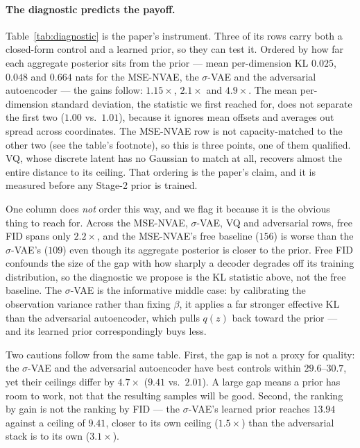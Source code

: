 \documentclass[sigconf,nonacm]{acmart}
\begin{document}
\paragraph{The diagnostic predicts the payoff.}
Table~\ref{tab:diagnostic} is the paper's instrument. Three of its rows
carry both a closed-form control and a learned prior, so they can test it.
Ordered by how far each aggregate posterior sits from the prior --- mean
per-dimension KL $0.025$, $0.048$ and $0.664$ nats for the MSE-NVAE, the
$\sigma$-VAE and the adversarial autoencoder --- the gains follow: $1.15\times$,
$2.1\times$ and $4.9\times$. The mean per-dimension standard deviation, the
statistic we first reached for, does not separate the first two ($1.00$ vs.\
$1.01$), because it ignores mean offsets and averages out spread across
coordinates. The MSE-NVAE row is not capacity-matched to the other two (see the
table's footnote), so this is three points, one of them qualified.
VQ, whose discrete latent has no Gaussian to match at all, recovers almost the
entire distance to its ceiling. That ordering is the paper's claim, and it is
measured before any Stage-2 prior is trained.

One column does \emph{not} order this way, and we flag it because it is the
obvious thing to reach for. Across the MSE-NVAE, $\sigma$-VAE, VQ and adversarial rows,
free FID spans only $2.2\times$, and the MSE-NVAE's free baseline ($156$) is worse than the $\sigma$-VAE's ($109$) even though its aggregate
posterior is closer to the prior. Free FID confounds the size of the gap with
how sharply a decoder degrades off its training distribution, so the diagnostic
we propose is the KL statistic above, not the free baseline. The $\sigma$-VAE is the informative middle case: by
calibrating the observation variance rather than fixing $\beta$, it applies a
far stronger effective KL than the adversarial autoencoder, which pulls $q(z)$
back toward the prior --- and its learned prior correspondingly buys less.

Two cautions follow from the same table. First, the gap is not a proxy for
quality: the $\sigma$-VAE and the adversarial autoencoder have best
controls within $29.6$--$30.7$, yet their ceilings differ by $4.7\times$
($9.41$ vs.\ $2.01$). A large
gap means a prior has room to work, not that the resulting samples will be good.
Second, the ranking by gain is not the ranking by FID --- the $\sigma$-VAE's
learned prior reaches $13.94$ against a ceiling of $9.41$, closer to its own
ceiling ($1.5\times$) than the adversarial stack is to its own ($3.1\times$).
\end{document}

